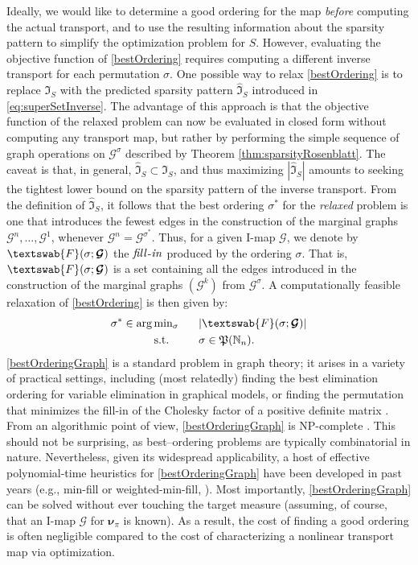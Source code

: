 \documentclass[twoside,11pt]{article}
\newcommand{\genm}{\boldsymbol{\nu} }   %
\newcommand{\Gcb}{\boldsymbol{\mathcal{G}}}
\newcommand{\Nbb}{\mathbb{N}}
\newcommand{\sparse}{ \mathfrak{I} }
\newcommand{\fillin}{\textswab{F} }
\newcommand{\permset}{\mathfrak{P} }
\begin{document}
Ideally, we would like to determine a good ordering for the map
\textit{before} computing the actual transport, and to use the
resulting information about the sparsity pattern to simplify the
optimization problem for $S$.
%
However, evaluating the objective function of \eqref{bestOrdering}
requires computing a different inverse transport for each permutation
$\sigma$.  One possible way to relax \eqref{bestOrdering} is to
replace $\sparse_S$ with the predicted sparsity pattern
$\widehat{\sparse}_S$ introduced in \eqref{eq:superSetInverse}.  The
advantage of this approach is that the objective function of the
relaxed problem can now be evaluated in closed form without computing
any transport map, but rather by performing the simple sequence of graph
operations on $\Gcb^\sigma$ %
described by Theorem
\ref{thm:sparsityRosenblatt}.  The caveat is that, in general,
$\widehat{\sparse}_S \subset \sparse_S$, and thus maximizing
$| \widehat{\sparse}_S |$ amounts to seeking the tightest lower bound on
the sparsity pattern of the inverse transport.
%
From the definition of $\widehat{\sparse}_S$, it follows that the best
ordering $\sigma^*$ for the \textit{relaxed} problem is one that introduces
the fewest edges in the construction of the 
marginal graphs $\Gcb^n,\ldots,\Gcb^1$, 
whenever $\Gcb^n=\Gcb^{\sigma^*}$.
%
%
Thus, for a given I-map $\Gcb$, we
denote by $\fillin (\sigma;\Gcb)$ the ${\it fill}$-${\it in}$ produced 
by the ordering $\sigma$.
That is, $\fillin (\sigma;\Gcb)$ is a set containing
all the edges introduced in the construction of the 
 marginal graphs $(\Gcb^k)$ from $\Gcb^\sigma$.
A computationally feasible
relaxation of \eqref{bestOrdering} is then given by:
%
%
%
%
%
\begin{alignat}{2}  \label{bestOrderingGraph}
  \sigma^* \in {\rm arg} &\, {\rm min_\sigma} &&\phantom{=}  
                                            | \fillin (\sigma;\Gcb) |   \\
                         &\, {\rm s.t.}       &&\phantom{=} 
                                            \sigma \in \permset(\Nbb_n).  
                         \nonumber 
\end{alignat} 
\eqref{bestOrderingGraph} is a standard problem in graph theory; it
arises in a variety of practical settings, including (most relatedly)
finding the best elimination ordering for variable elimination in
graphical models, 
%
or finding the
permutation that minimizes the fill-in of the Cholesky factor of a
positive definite matrix \citep{george1989evolution,saad2003iterative}.
From an algorithmic point of view, \eqref{bestOrderingGraph} is
NP-complete \citep{yannakakis1981computing}.  This should not be
surprising, as best--ordering problems are typically combinatorial in
nature.  Nevertheless, given its widespread applicability, a host of
effective polynomial-time heuristics for \eqref{bestOrderingGraph}
have been developed in past years (e.g., min-fill or
weighted-min-fill, \citealp{koller2009probabilistic}).  Most importantly,
\eqref{bestOrderingGraph} can be solved without 
ever 
touching the target measure
%
%
(assuming, of course, that an I-map $\Gcb$ for $\genm_\pi$ is
known).
%
As a result, the cost of finding a good ordering is often negligible
compared to the cost of characterizing a nonlinear transport map via optimization.
%
%
%
%
%
%
\end{document}

